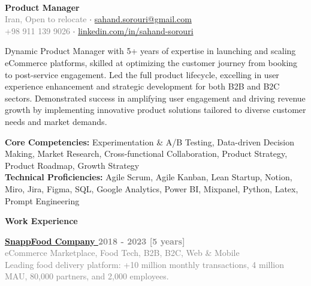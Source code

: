 \documentclass[a4paper,10.9pt]{article}
\newcommand{\sectiontitle}[1]{
  \begin{tcolorbox}[colback=black, colupper=white, sharp corners, boxrule=0pt, boxsep=3pt, left=0pt, right=0pt, top=1pt, bottom=1pt]
    \Large\bfseries #1
  \end{tcolorbox}
}
\newcommand{\majorposition}[1]{{\hspace{0pt}\Large\bfseries #1}\vspace{0.2em}}
\newcommand{\graytext}[1]{\textcolor{grey}{#1}} %
\newcommand{\boxedtext}[1]{\begin{mybox}#1\end{mybox}}
\begin{document}
\thispagestyle{empty}
\begin{center}
\\
\vspace{7pt}
{\textbf{\LARGE{Product Manager}}}\\
\normalsize
\graytext{Iran, Open to relocate} $\cdot$ \href{mailto:sahand.sorouri@gmail.com}{sahand.sorouri@gmail.com}
\\
\graytext{+98 911 139 9026} $\cdot$ \href{https://linkedin.com/in/sahand-sorouri}{linkedin.com/in/sahand-sorouri \faExternalLink{}} %
\end{center}
{Dynamic Product Manager with 5+ years of expertise in launching and scaling eCommerce platforms, skilled at optimizing the customer journey from booking to post-service engagement. Led the full product lifecycle, excelling in user experience enhancement and strategic development for both B2B and B2C sectors. Demonstrated success in amplifying user engagement and driving revenue growth by implementing innovative product solutions tailored to diverse customer needs and market demands.}
{\boxedtext{\textbf{Core Competencies: }Experimentation \& A/B Testing, Data-driven Decision Making, Market Research, Cross-functional Collaboration, Product Strategy, Product Roadmap, Growth Strategy\\
\textbf{Technical Proficiencies:} Agile Scrum, Agile Kanban, Lean Startup, Notion, Miro, Jira, Figma, SQL, Google Analytics, Power BI, Mixpanel, Python, Latex, Prompt Engineering}}
\sectiontitle{Work Experience}
{\majorposition{\href{https://snappfood.ir}{SnappFood Company \faExternalLink{}}} \hfill\Large{\textbf{\graytext{2018 - 2023 [5 years]}}}}\\
{\small{\graytext{eCommerce Marketplace, Food Tech, B2B, B2C, Web \& Mobile}}\\
\small\graytext{Leading food delivery platform: +10 million monthly transactions, 4 million MAU, 80,000 partners, and 2,000 employees.}}
\vspace{5pt}
\end{document}
